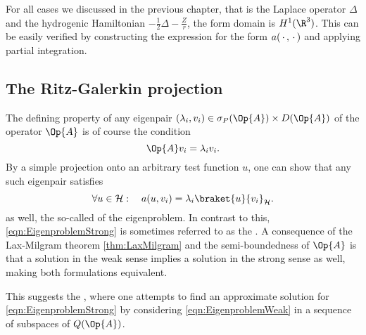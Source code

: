 \begin{exmp}
	For all cases we discussed in the previous chapter,
	that is the Laplace operator $\Delta$ and the hydrogenic
	Hamiltonian $-\frac12 \Delta - \frac{Z}{r}$,
	the form domain is $H^1(\R^3)$.
	This can be easily verified by constructing the expression
	for the form $a(\,\cdot\,, \,\cdot\,)$ and applying partial integration.
\end{exmp}

\subsection{The Ritz-Galerkin projection}
\label{sec:RitzGalerkin}
The defining property of any eigenpair
$(\lambda_i, v_i) \in \sigma_P(\Op{A}) \times D(\Op{A})$
of the operator $\Op{A}$ is of course the condition
\begin{equation}
	\Op{A} v_i = \lambda_i v_i.
	\label{eqn:EigenproblemStrong}
\end{equation}
By a simple projection onto an arbitrary test function $u$,
one can show that any such eigenpair satisfies
\begin{equation}
	\forall u \in \hilbert: \quad a(u, v_i) = \lambda_i \braket{u}{v_i}_\hilbert.
	\label{eqn:EigenproblemWeak}
\end{equation}
as well, the so-called  of the eigenproblem.
In contrast to this, \eqref{eqn:EigenproblemStrong} is sometimes
referred to as the .
A consequence of the Lax-Milgram theorem \vref{thm:LaxMilgram}
and the semi-boundedness of $\Op{A}$
is that a solution in the weak sense implies a solution in the strong sense
as well, making both formulations equivalent.

This suggests the ,
where one attempts to find an approximate solution
for \eqref{eqn:EigenproblemStrong}
by considering \eqref{eqn:EigenproblemWeak}
in a sequence of subspaces of $Q(\Op{A})$.

